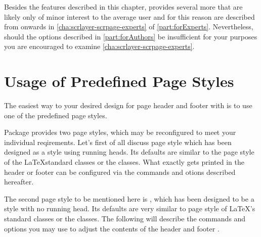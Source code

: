 Besides the features described in this chapter, 
provides several more that are likely only of minor interest to the average
user and for this reason are described from 
 onwards in
\autoref{cha:scrlayer-scrpage-experts} of \autoref{part:forExperts}.
Nevertheless, should the options described in \autoref{part:forAuthors} be
insufficient for your purposes you are encouraged to examine
\autoref{cha:scrlayer-scrpage-experts}.




\section{Usage of Predefined Page Styles}

The easiest way to your desired design for page header and footer with
 is to use one of the predefined page styles.

\begin{Declaration}
\end{Declaration}
Package  provides two page styles, which may be
reconfigured to meet your individual reqirements. Let's first of all discuss
page style  which has been designed as a style using
running heads. Its defaults are similar to the page style
 of the \LaTeX standard classes
or the \KOMAScript{} classes. What exactly gets printed in the header or
footer can be configured via the commands and otions described hereafter.

The second page style to be mentioned here is ,
which has been designed to be a style with no running head. Its defaults are
very similar to page style  of \LaTeX's
standard classes or the \KOMAScript{} classes. The following will describe the
commands and options you may use to adjust the contents of the header and
footer .

